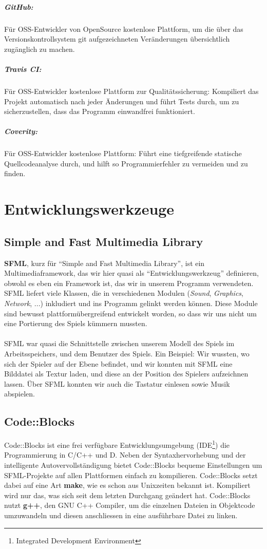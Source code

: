 \documentclass[12pt,a4paper]{scrartcl}
\newcommand{\q}[1]{``#1''}
\begin{document}
\subparagraph{GitHub:}
Für OSS-Entwickler von OpenSource kostenlose Plattform, um die über das Versionskontrollsystem git aufgezeichneten Veränderungen übersichtlich zugänglich zu machen.

\subparagraph{Travis CI:}
Für OSS-Entwickler kostenlose Plattform zur Qualitätssicherung: Kompiliert das Projekt automatisch nach jeder Änderungen und führt Tests durch, um zu sicherzustellen, dass das Programm einwandfrei funktioniert.

\subparagraph{Coverity:}
Für OSS-Entwickler kostenlose Plattform: Führt eine tiefgreifende statische Quellcodeanalyse durch, und hilft so Programmierfehler zu vermeiden und zu finden.

\section{Entwicklungswerkzeuge}
\subsection{Simple and Fast Multimedia Library}
\textbf{SFML}, kurz für \q{Simple and Fast Multimedia Library}, ist ein Multimediaframework, das wir hier quasi als
\q{Entwicklungswerkzeug} definieren, obwohl es eben ein Framework ist, das wir in unserem Programm verwendeten. SFML
liefert viele Klassen, die in verschiedenen Modulen (\textit{Sound}, \textit{Graphics}, \textit{Network}, ...) inkludiert
und ins Programm gelinkt werden können. Diese Module sind bewusst plattformübergreifend entwickelt worden, so dass wir uns
nicht um eine Portierung des Spiels kümmern mussten.
\\
\\
SFML war quasi die Schnittstelle zwischen unserem Modell des Spiels im Arbeitsspeichers, und dem Benutzer des Spiels. Ein Beispiel:
Wir wussten, wo sich der Spieler auf der Ebene befindet, und wir konnten mit SFML eine Bilddatei als Textur laden, und diese
an der Position des Spielers aufzeichnen lassen. Über SFML konnten wir auch die Tastatur einlesen sowie Musik abspielen.

\subsection{Code::Blocks}
Code::Blocks ist eine frei verfügbare Entwicklungsumgebung (IDE\footnote{Integrated Development Environment}) die Programmierung in C/C++ und D.
Neben der Syntaxhervorhebung und der intelligente Autovervollständigung bietet Code::Blocks bequeme Einstellungen um SFML-Projekte auf allen Plattformen
einfach zu kompilieren. Code::Blocks setzt dabei auf eine Art \textbf{make}, wie es schon aus Unixzeiten bekannt ist. Kompiliert wird nur das, was sich
seit dem letzten Durchgang geändert hat. Code::Blocks nutzt \textbf{g++}, den GNU C++ Compiler, um die einzelnen Dateien in Objektcode umzuwandeln und diesen
anschliessen in eine ausführbare Datei zu linken.
\end{document}
